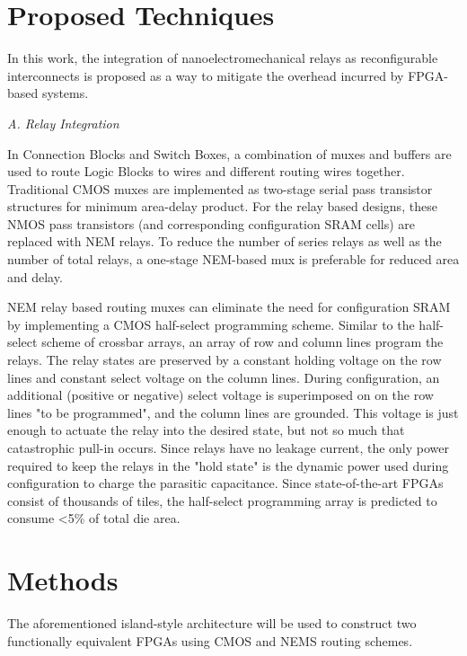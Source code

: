 \documentclass[twoside,twocolumn]{article}
\begin{document}
\section{Proposed Techniques}\label{sec:proposed}

In this work, the integration of nanoelectromechanical relays as reconfigurable interconnects is proposed as a way to mitigate the overhead incurred by FPGA-based systems. 

\textit{A. Relay Integration}

In Connection Blocks and Switch Boxes, a combination of muxes and buffers are used to route Logic Blocks to wires and different routing wires together. Traditional CMOS muxes are implemented as two-stage serial pass transistor structures for minimum area-delay product. For the relay based designs, these NMOS pass transistors (and corresponding configuration SRAM cells) are replaced with NEM relays. To reduce the number of series relays as well as the number of total relays, a one-stage NEM-based mux is preferable for reduced area and delay\cite{chen_efficient_2010}.

NEM relay based routing muxes can eliminate the need for configuration SRAM by implementing a CMOS half-select programming scheme\cite{chen_efficient_2010}. Similar to the half-select scheme of crossbar arrays, an array of row and column lines program the relays. The relay states are preserved by a constant holding voltage on the row lines and constant select voltage on the column lines. During configuration, an additional (positive or negative) select voltage is superimposed on on the row lines "to be programmed", and the column lines are grounded. This voltage is just enough to actuate the relay into the desired state, but not so much that catastrophic pull-in occurs. Since relays have no leakage current, the only power required to keep the relays in the "hold state" is the dynamic power used during configuration to charge the parasitic capacitance. Since state-of-the-art FPGAs consist of thousands of tiles, the half-select programming array is predicted to consume <5\% of total die area.



\section{Methods}\label{sec:methods}
The aforementioned island-style architecture will be used to construct two functionally equivalent FPGAs using CMOS and NEMS routing schemes.
\end{document}
